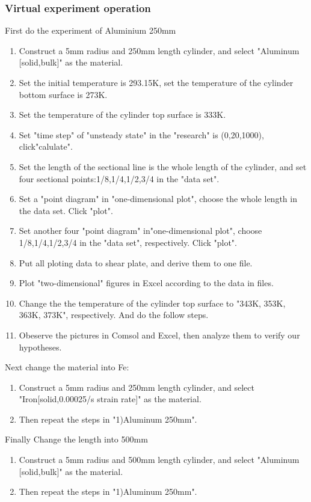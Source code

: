 \documentclass[12pt]{article}
\numberwithin{equation}{section}
\begin{document}
\subsubsection{Virtual experiment operation}
First do the experiment of Aluminium 250mm
\begin{enumerate}
  \item Construct a 5mm radius and 250mm length cylinder, and select "Aluminum [solid,bulk]" as the material.  
  \item Set the initial temperature is 293.15K, set the temperature of the cylinder bottom surface is 273K.  
  \item Set the temperature of the cylinder top surface is 333K.  
  \item Set "time step" of "unsteady state" in the "research" is (0,20,1000), click"calulate".    
  \item Set the length of the sectional line is the whole length of the cylinder, and set four sectional points:1/8,1/4,1/2,3/4 in the "data set".  
  \item Set a "point diagram" in "one-dimensional plot", choose the whole length in the data set. Click "plot".  
  \item Set another four "point diagram" in"one-dimensional plot", choose 1/8,1/4,1/2,3/4 in the "data set", respectively. Click "plot".  
  \item Put all ploting data to shear plate, and derive them to one file.   
  \item Plot "two-dimensional" figures in Excel according to the data in files.  
  \item Change the the temperature of the cylinder top surface to "343K, 353K, 363K, 373K", respectively. And do the follow steps.  
  \item Obeserve the pictures in Comsol and Excel, then analyze them to verify our hypotheses.
\end{enumerate}

Next change the material into Fe:
\begin{enumerate}
  \item Construct a 5mm radius and 250mm length cylinder, and select "Iron[solid,0.00025/s strain rate]" as the material.  
  \item Then repeat the steps in "1)Aluminum 250mm".
\end{enumerate}

Finally Change the length into 500mm


\begin{enumerate}
  \item Construct a 5mm radius and 500mm length cylinder, and select "Aluminum [solid,bulk]" as the material.  
  \item Then repeat the steps in "1)Aluminum 250mm".
\end{enumerate}
\end{document}

